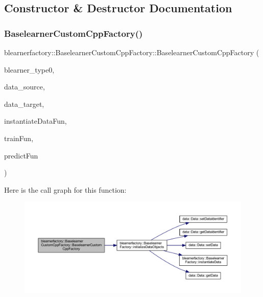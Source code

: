 \subsection{Constructor \& Destructor Documentation}
\mbox{\label{classblearnerfactory_1_1_baselearner_custom_cpp_factory_aede05893f296f7cc4fa07b0601a426e8}} 
\subsubsection{\texorpdfstring{Baselearner\+Custom\+Cpp\+Factory()}{BaselearnerCustomCppFactory()}}
{\footnotesize\ttfamily blearnerfactory\+::\+Baselearner\+Custom\+Cpp\+Factory\+::\+Baselearner\+Custom\+Cpp\+Factory (\begin{DoxyParamCaption}\item[{const std\+::string \&}]{blearner\+\_\+type0,  }\item[{\mbox{\hyperlink{classdata_1_1_data}{data\+::\+Data}} $\ast$}]{data\+\_\+source,  }\item[{\mbox{\hyperlink{classdata_1_1_data}{data\+::\+Data}} $\ast$}]{data\+\_\+target,  }\item[{S\+E\+XP}]{instantiate\+Data\+Fun,  }\item[{S\+E\+XP}]{train\+Fun,  }\item[{S\+E\+XP}]{predict\+Fun }\end{DoxyParamCaption})}

Here is the call graph for this function\+:\nopagebreak
\begin{figure}[H]
\begin{center}
\leavevmode
\includegraphics[width=350pt]{classblearnerfactory_1_1_baselearner_custom_cpp_factory_aede05893f296f7cc4fa07b0601a426e8_cgraph}
\end{center}
\end{figure}


